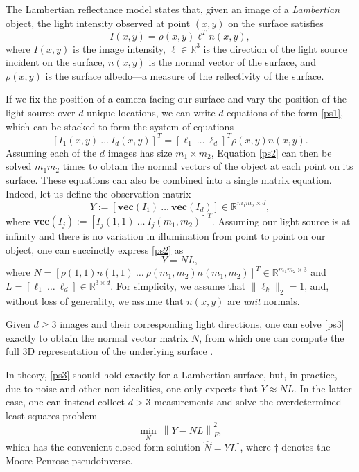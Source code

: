 
The Lambertian reflectance model states that, given an image of a \emph{Lambertian} object, the light intensity observed at point $(x,y)$ on the surface satisfies
\begin{equation} \label{ps1}
I(x,y) = \rho(x,y) \ell^T n(x,y),
\end{equation}
where $I(x,y)$ is the image intensity, $\ell \in \mathbb{R}^3$ is the direction of the light source incident on the surface, $n(x,y)$ is the normal vector of the surface, and $\rho (x,y)$ is the surface albedo---a measure of the reflectivity of the surface. 

If we fix the position of a camera facing our surface and vary the position of the light source over $d$ unique locations, we can write $d$ equations of the form \eqref{ps1}, which can be stacked to form the system of equations
\begin{equation} \label{ps2}
[I_1(x,y)~\ldots~I_d(x,y)]^T = [\ell_1~\ldots~\ell_d]^T \rho(x,y) n(x,y).
\end{equation}
Assuming each of the $d$ images has size $m_1 \times m_2$, Equation \eqref{ps2} can then be solved $m_1 m_2$ times to obtain the normal vectors of the object at each point on its surface. These equations can also be combined into a single matrix equation. Indeed, let us define the observation matrix
\begin{equation} \label{ddef}
Y := \left [\textbf{vec}(I_1)~\ldots~\textbf{vec}(I_d) \right ] \in \mathbb{R}^{m_1 m_2 \times d},
\end{equation}
where $\textbf{vec}(I_j) := [I_j(1,1)~\ldots~I_j(m_1,m_2)]^T$. Assuming our light source is at infinity and there is no variation in illumination from point to point on our object, one can succinctly express \eqref{ps2} as
\begin{equation} \label{ps3}
Y = NL,
\end{equation}
where $N = [\rho(1,1) n(1,1)~\ldots~\rho(m_1,m_2) n(m_1,m_2)]^T \in \mathbb{R}^{m_1 m_2 \times 3}$ and $L = [\ell_1~\ldots~\ell_d] \in \mathbb{R}^{3 \times d}$. For simplicity, we assume that $\|\ell_k\|_2=1$, and, without loss of generality, we assume that $n(x,y)$ are \emph{unit} normals.

Given $d \geq 3$ images and their corresponding light directions, one can solve \eqref{ps3} exactly to obtain the normal vector matrix $N$, from which one can compute the full 3D representation of the underlying surface \cite{simchony1990}.

In theory, \eqref{ps3} should hold exactly for a Lambertian surface, but, in practice, due to noise and other non-idealities, one only expects that $Y \approx NL$. In the latter case, one can instead collect $d > 3$ measurements and solve the overdetermined least squares problem
\begin{equation} \label{eq:ls}
\min_{N} \ \left \| Y - NL \right \|_F^2,
\end{equation}
which has the convenient closed-form solution $\hat{N} = YL^\dagger$, where $\dagger$ denotes the Moore-Penrose pseudoinverse.
